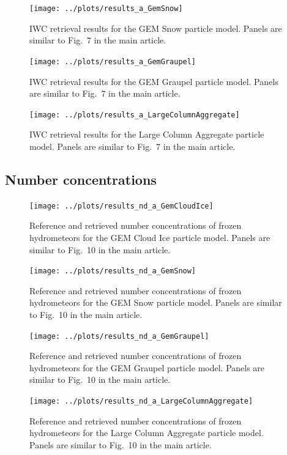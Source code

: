 \documentclass[journal abbreviation, manuscript]{copernicus}
\begin{document}
\clearpage
\begin{figure}[!hbpt]
\centering
\texttt{[image: ../plots/results\_a\_GemSnow]}
\caption{IWC retrieval results for the GEM Snow particle model. Panels are similar to
  Fig.~7 in the main article.}
\end{figure}

\clearpage
\begin{figure}[!hbpt]
\centering
\texttt{[image: ../plots/results\_a\_GemGraupel]}
\caption{IWC retrieval results for the GEM Graupel particle model. Panels are similar to
  Fig.~7 in the main article.}
\end{figure}

\clearpage
\begin{figure}[!hbpt]
\centering
\texttt{[image: ../plots/results\_a\_LargeColumnAggregate]}
\caption{IWC retrieval results for the Large Column Aggregate particle model. Panels are similar to
  Fig.~7 in the main article.}
\end{figure}

\subsection{Number concentrations}

\clearpage
\begin{figure}[!hbpt]
\centering
\texttt{[image: ../plots/results\_nd\_a\_GemCloudIce]}
\caption{Reference and retrieved number concentrations of frozen hydrometeors for the
  GEM Cloud Ice particle model. Panels are similar to Fig.~10 in the main article.}
\end{figure}

\clearpage
\begin{figure}[!hbpt]
\centering
\texttt{[image: ../plots/results\_nd\_a\_GemSnow]}
\caption{Reference and retrieved number concentrations of frozen hydrometeors for the
  GEM Snow particle model. Panels are similar to Fig.~10 in the main article.}
\end{figure}

\clearpage
\begin{figure}[!hbpt]
\centering
\texttt{[image: ../plots/results\_nd\_a\_GemGraupel]}
\caption{Reference and retrieved number concentrations of frozen hydrometeors for the
  GEM Graupel particle model. Panels are similar to Fig.~10 in the main article.}
\end{figure}

\clearpage
\begin{figure}[!hbpt]
\centering
\texttt{[image: ../plots/results\_nd\_a\_LargeColumnAggregate]}
\caption{Reference and retrieved number concentrations of frozen hydrometeors for the
  Large Column Aggregate particle model. Panels are similar to Fig.~10 in the main article.}
\end{figure}
\end{document}
